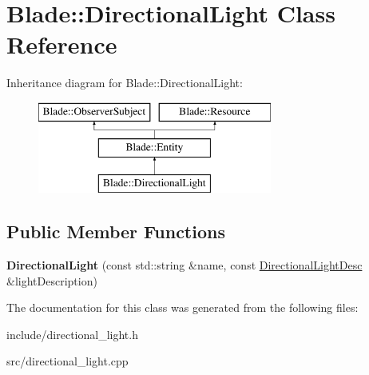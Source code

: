 \hypertarget{class_blade_1_1_directional_light}{}\section{Blade\+:\+:Directional\+Light Class Reference}
\label{class_blade_1_1_directional_light}
Inheritance diagram for Blade\+:\+:Directional\+Light\+:\begin{figure}[H]
\begin{center}
\leavevmode
\includegraphics[height=3.000000cm]{class_blade_1_1_directional_light}
\end{center}
\end{figure}
\subsection*{Public Member Functions}
\begin{DoxyCompactItemize}
\item 
\mbox{\label{class_blade_1_1_directional_light_a981db3910211a1e17b6099639621930f}} 
{\bfseries Directional\+Light} (const std\+::string \&name, const \hyperlink{struct_blade_1_1_directional_light_desc}{Directional\+Light\+Desc} \&light\+Description)
\end{DoxyCompactItemize}


The documentation for this class was generated from the following files\+:\begin{DoxyCompactItemize}
\item 
include/directional\+\_\+light.\+h\item 
src/directional\+\_\+light.\+cpp\end{DoxyCompactItemize}
